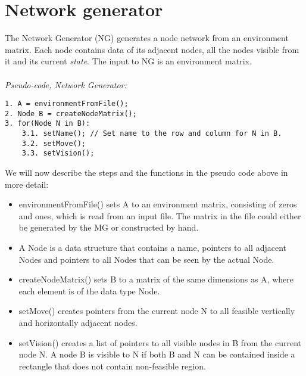 \section{Network generator}
The Network Generator (NG) generates a node network from an environment matrix. Each node contains data of its adjacent nodes, all the nodes visible from it and its current \emph{state}. The input to NG is an environment matrix.\\
\\
\noindent \emph{Pseudo-code, Network Generator:}
\begin{verbatim}
1. A = environmentFromFile();
2. Node B = createNodeMatrix();
3. for(Node N in B):
    3.1. setName(); // Set name to the row and column for N in B.
    3.2. setMove();
    3.3. setVision();
\end{verbatim}
We will now describe the steps and the functions in the pseudo code above in more detail:
\begin{itemize}
\item environmentFromFile() sets A to an environment matrix, consisting of zeros and ones, which is read from an input file. The matrix in the file could either be generated by the MG or constructed by hand.
\item A Node is a data structure that contains a name, pointers to all adjacent Nodes and pointers to all Nodes that can be seen by the actual Node.
\item createNodeMatrix() sets B to a matrix of the same dimensions as A, where each element is of the data type Node.
\item setMove() creates pointers from the current node N to all feasible vertically and horizontally adjacent nodes.
\item setVision() creates a list of pointers to all visible nodes in B from the current node N. A node B is visible to N if both B and N can be contained inside a rectangle that does not contain non-feasible region.
\end{itemize}